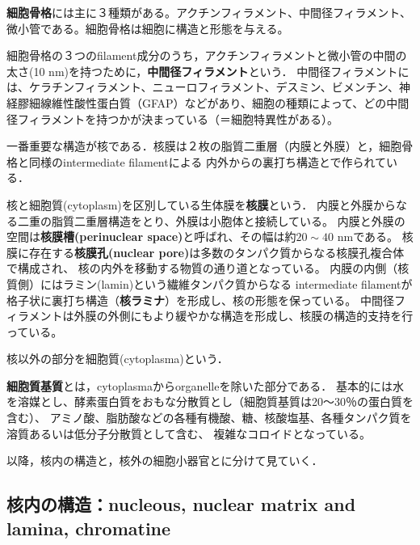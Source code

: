 \documentclass[uplatex, dvipdfmx]{jsreport}
\begin{document}
\begin{definition}
    \textbf{細胞骨格}には主に３種類がある。アクチンフィラメント、中間径フィラメント、微小管である。細胞骨格は細胞に構造と形態を与える。
\end{definition}
\begin{definition}
    細胞骨格の３つのfilament成分のうち，アクチンフィラメントと微小管の中間の太さ(10 nm)を持つために，\textbf{中間径フィラメント}という．
    中間径フィラメントには、ケラチンフィラメント、ニューロフィラメント、デスミン、ビメンチン、神経膠細線維性酸性蛋白質（GFAP）などがあり、細胞の種類によって、どの中間径フィラメントを持つかが決まっている（＝細胞特異性がある）。
\end{definition}

一番重要な構造が核である．核膜は２枚の脂質二重層（内膜と外膜）と，細胞骨格と同様のintermediate filamentによる
内外からの裏打ち構造とで作られている．

\begin{definition}
    核と細胞質(cytoplasm)を区別している生体膜を\textbf{核膜}という．
    内膜と外膜からなる二重の脂質二重層構造をとり、外膜は小胞体と接続している。
    内膜と外膜の空間は\textbf{核膜槽(perinuclear space)}と呼ばれ、その幅は約$20\sim 40$ nmである。
    核膜に存在する\textbf{核膜孔(nuclear pore)}は多数のタンパク質からなる核膜孔複合体で構成され、
    核の内外を移動する物質の通り道となっている。
    内膜の内側（核質側）にはラミン(lamin)という繊維タンパク質からなる
    intermediate filamentが格子状に裏打ち構造（\textbf{核ラミナ}）を形成し、核の形態を保っている。
    中間径フィラメントは外膜の外側にもより緩やかな構造を形成し、核膜の構造的支持を行っている。
\end{definition}

核以外の部分を細胞質(cytoplasma)という．

\begin{definition}
    \textbf{細胞質基質}とは，cytoplasmaからorganelleを除いた部分である．
    基本的には水を溶媒とし、酵素蛋白質をおもな分散質とし（細胞質基質は20〜30％の蛋白質を含む）、
    アミノ酸、脂肪酸などの各種有機酸、糖、核酸塩基、各種タンパク質を溶質あるいは低分子分散質として含む、
    複雑なコロイドとなっている。
\end{definition}

以降，核内の構造と，核外の細胞小器官とに分けて見ていく．

\subsection{核内の構造：nucleous, nuclear matrix and lamina, chromatine}
\end{document}
